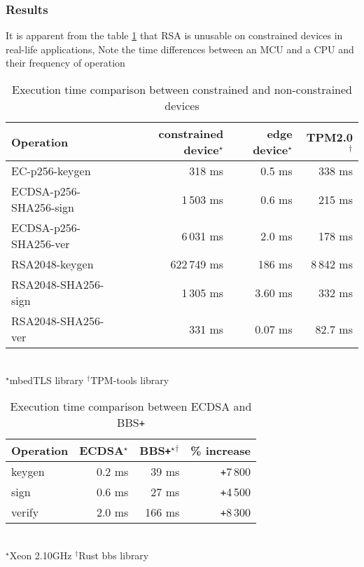 \subsubsection*{Results}
It is apparent from the table \ref{time-table1} that RSA is unusable on constrained devices in real-life applications,  Note the time differences between an MCU and a CPU and their frequency of operation

\begin{table}[!h]
    \centering
    \begin{tabular}{| l || r | r | r |}
        \hline      
        \textbf{Operation} & \textbf{constrained device}$^\star$ & \textbf{edge device}$^\star$  & \textbf{TPM2.0}$^\dagger$\\ [0.5ex] 
        \hline \hline 
        EC-p256-keygen                  & 318 ms  & 0.5 ms & 338  ms  \\
        \hline
        ECDSA-p256-SHA256-sign          & 1\,503 ms & 0.6 ms & 215  ms  \\
        \hline
        ECDSA-p256-SHA256-ver           & 6\,031 ms & 2.0 ms & 178  ms  \\
        \hline \hline
        RSA2048-keygen                  & 622\,749 ms  & 186  ms & 8\,842 ms   \\
        \hline
        RSA2048-SHA256-sign          & 1\,305 ms & 3.60 ms & 332  ms  \\
        \hline
        RSA2048-SHA256-ver           & 331 ms & 0.07  ms  & 82.7 ms  \\
        \hline
    \end{tabular}\\
    \footnotesize $^\star$mbedTLS library \enspace\enspace $^\dagger$TPM-tools library
    \caption{Execution time comparison between constrained and non-constrained devices}
    \label{time-table1}
\end{table}

   
\begin{table}[!h]
    \centering
    \begin{tabular}{|l|| r | r | r|}
        \hline 
        \textbf{Operation} & \textbf{ECDSA}$^\star$ & \textbf{BBS\texttt{+}}$^\star$$^\dagger$ & \textbf{\% increase} \\ [0.5ex] 
        \hline  \hline 
        keygen         & 0.2   ms      & 39 ms   &\texttt{+}7\,800\\
        \hline
        sign           & 0.6   ms      & 27  ms   &\texttt{+}4\,500\\
        \hline
        verify         & 2.0  ms         & 166 ms   &\texttt{+}8\,300\\
        \hline
    \end{tabular}
    \\
    \footnotesize $^\star$Xeon 2.10GHz \enspace\enspace $^\dagger$Rust bbs library
    \caption{Execution time comparison between ECDSA and BBS\texttt{+}}
    \label{time-table2}
\end{table}
    

